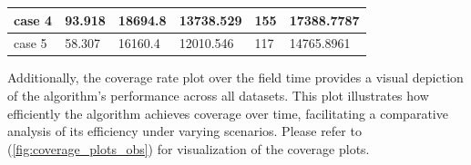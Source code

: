 \begin{table}[H]
\begin{tabular}{llllll}
    \rowcolor[HTML]{FFFFC7} 
    case 4                  & 93.918                                                                                 & 18694.8                                                                                   & 13738.529                                                                           & 155                                                                        & 17388.7787                                                                                 \\ \hline
    \rowcolor[HTML]{FFFFC7} 
    case 5                  & 58.307                                                                                 & 16160.4                                                                                   & 12010.546                                                                           & 117                                                                        & 14765.8961                                                                                 \\ \hline
    \end{tabular}
    \end{table}

\vspace{3mm}

Additionally, the coverage rate plot over the field time provides a visual depiction of the algorithm's performance across all datasets. This plot illustrates how efficiently the algorithm achieves coverage over time, facilitating a comparative analysis of its efficiency under varying scenarios. Please refer to (\autoref{fig:coverage_plots_obs}) for visualization of the coverage plots.

